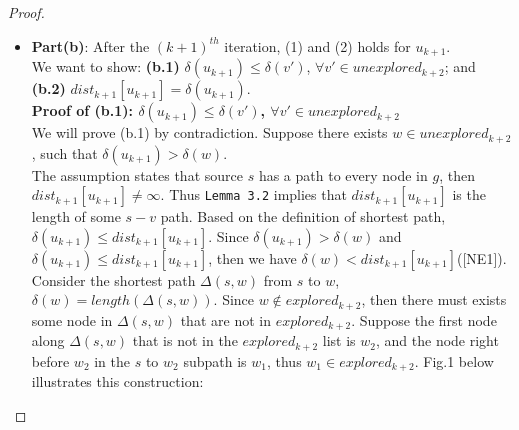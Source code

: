 \begin{proof}
\begin{itemize}
\[\begin{cases}
          dist_j[q] & otherwise 
        \end{cases}
        \right\}
      \]
  \\
  Since $dist_{i+1}[q] = \delta(q) \leq length(p)$ for all path $p$ from $s$ to $q$, then for each proceeding $j^{th}$ iteration after the $i^{th}$ iteration, there does not exists such $q''$ such that $dist_j[q''] + weight(q'', q) < \delta(q) = dist_{i+1}[q]$. Hence $dist_{j+1}[q] = \delta(q) = dist_{i+1}[q], \forall j > i$. Since $k+1 > i$, then for all $q \in S$, $dist_{k+1} = \delta(q) = dist_{i+1}[q]$. (2) holds for $explored_{k+1}$. 
  \\\\
  Hence we have proved that both (1) and (2) holds for all nodes in $explored_{k+1}$.




  \item \textbf{\large{Part(b)}}: After the $(k+1)^{th}$ iteration, (1) and (2) holds for $u_{k+1}$. 
  \\
  We want to show: \textbf{(b.1)} $\delta(u_{k+1}) \leq \delta(v')$, $\forall v' \in unexplored_{k+2}$; and \textbf{(b.2)} $dist_{k+1}[u_{k+1}] = \delta(u_{k+1})$. 
  \\
  \textbf{Proof of (b.1): $\delta(u_{k+1}) \leq \delta(v')$, $\forall v' \in unexplored_{k+2}$}
  \\
  We will prove (b.1) by contradiction. Suppose there exists $w \in unexplored_{k+2}$, such that $\delta(u_{k+1}) > \delta(w)$. 
  \\
  The assumption states that source $s$ has a path to every node in $g$, then $dist_{k+1}[u_{k+1}] \neq \infty$. Thus \texttt{Lemma 3.2} implies that $dist_{k+1}[u_{k+1}]$ is the length of some $s-v$ path. Based on the definition of shortest path, $\delta(u_{k+1}) \leq dist_{k+1}[u_{k+1}]$. Since $\delta(u_{k+1}) > \delta(w)$ and $\delta(u_{k+1}) \leq dist_{k+1}[u_{k+1}]$, then we have $\delta(w) < dist_{k+1}[u_{k+1}]$([NE1]). 
  \\
  Consider the shortest path $\Delta(s, w)$ from $s$ to $w$, $\delta(w) = length(\Delta(s, w))$. Since $w \notin explored_{k+2}$, then there must exists some node in $\Delta(s, w)$ that are not in $explored_{k+2}$. Suppose the first node along $\Delta(s, w)$ that is not in the $explored_{k+2}$ list is $w_2$, and the node right before $w_2$ in the $s$ to $w_2$ subpath is $w_1$, thus $w_1 \in explored_{k+2}$. Fig.1 below illustrates this construction: 

\end{itemize}
\end{proof}
